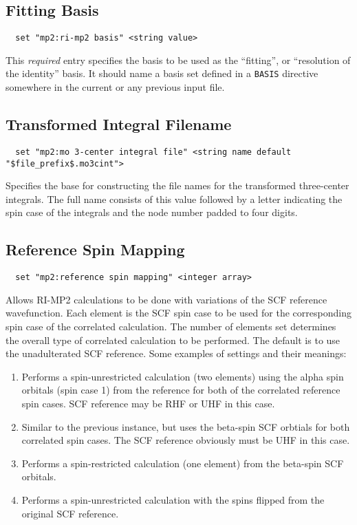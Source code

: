 \subsection{Fitting Basis}

\begin{verbatim}
  set "mp2:ri-mp2 basis" <string value>
\end{verbatim}

This {\em required} entry specifies the basis to be used as the
``fitting'', or ``resolution of the identity'' basis.  It should name
a basis set defined in a \verb+BASIS+ directive somewhere in the
current or any previous input file.


\subsection{Transformed Integral Filename}

\begin{verbatim}
  set "mp2:mo 3-center integral file" <string name default "$file_prefix$.mo3cint">
\end{verbatim}

Specifies the base for constructing the file names for the transformed
three-center integrals.  The full name consists of this value followed
by a letter indicating the spin case of the integrals and the node
number padded to four digits.

\subsection{Reference Spin Mapping}

\begin{verbatim}
  set "mp2:reference spin mapping" <integer array>
\end{verbatim}

Allows RI-MP2 calculations to be done with variations of the SCF
reference wavefunction.  Each element is the SCF spin case to be used
for the corresponding spin case of the correlated calculation.  The
number of elements set determines the overall type of correlated
calculation to be performed.  The default is to use the unadulterated
SCF reference.  Some examples of settings and their meanings:
\begin{enumerate}
\item[``\verb+1 1+''] Performs a spin-unrestricted calculation (two
elements) using the alpha spin orbitals (spin case 1) from the
reference for both of the correlated reference spin cases. SCF
reference may be RHF or UHF in this case.
\item[``\verb+2 2+''] Similar to the previous instance, but uses the beta-spin
SCF orbtials for both correlated spin cases.  The SCF reference
obviously must be UHF in this case.
\item[``\verb+2+''] Performs a spin-restricted calculation (one element)
from the beta-spin SCF orbitals.
\item[``\verb+2 1+''] Performs a spin-unrestricted calculation with the
spins flipped from the original SCF reference.
\end{enumerate}

